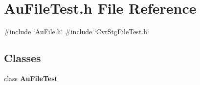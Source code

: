 \section{Au\+File\+Test.\+h File Reference}
\label{AuFileTest_8h}
{\ttfamily \#include \char`\"{}Au\+File.\+h\char`\"{}}\newline
{\ttfamily \#include \char`\"{}Cvr\+Stg\+File\+Test.\+h\char`\"{}}\newline
\subsection*{Classes}
\begin{DoxyCompactItemize}
\item 
class \textbf{ Au\+File\+Test}
\end{DoxyCompactItemize}
